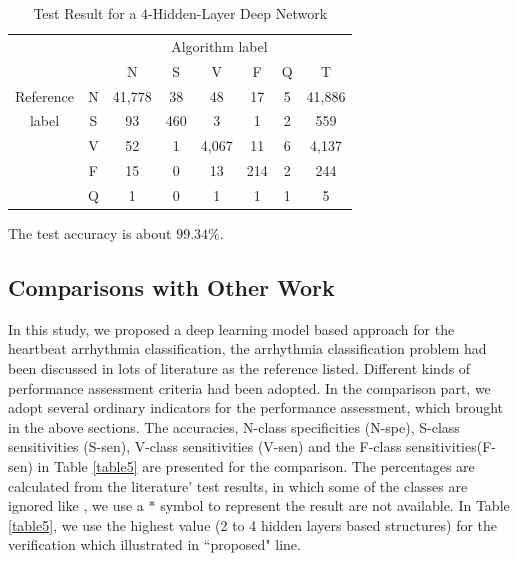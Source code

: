 \documentclass[journal]{IEEEtran}
\begin{document}
\begin{table}[!htbp]
\begin{center}
\begin{threeparttable}
\caption{Test Result for a 4-Hidden-Layer Deep Network}
\label{table4}
\begin{tabular}{cccccccc}
\hline
\multicolumn{6}{r}{Algorithm label} \\
\cline{3-7}
		&  & N & S      & V    & F     & Q   & T\\
\hline
 Reference & N & 41,778 &  38  &  48   & 17  & 5  &  41,886 \\
	label  & S &  93    & 460  &   3   & 1   & 2  &  559\\
		   & V &  52    & 1    & 4,067 & 11  & 6  &  4,137\\
		   & F &  15    & 0    & 13    & 214 & 2  &  244\\
		   & Q &  1     & 0    & 1     & 1   & 1  &  5\\
\hline
\end{tabular}
\begin{tablenotes}
\item The test accuracy is about $99.34\%$.
\end{tablenotes}
\end{threeparttable}
\end{center}
\end{table}


\subsection{Comparisons with Other Work}
In this study, we proposed a deep learning model based approach for the heartbeat arrhythmia classification, the arrhythmia classification problem had been discussed in lots of literature as the reference listed. Different kinds of performance assessment criteria had been adopted. In the comparison part, we adopt several ordinary indicators for the performance assessment, which brought in the above sections. The accuracies, N-class specificities (N-spe), S-class sensitivities (S-sen), V-class sensitivities (V-sen) and the F-class sensitivities(F-sen) in Table \ref{table5} are presented for the comparison. The percentages are calculated from the literature' test results, in which some of the classes are ignored like \cite{melgan}, we use a $*$ symbol to represent the result are not available. 
In Table \ref{table5}, we use the highest value (2 to 4 hidden layers based structures) for the verification which illustrated in ``proposed" line.
\end{document}
